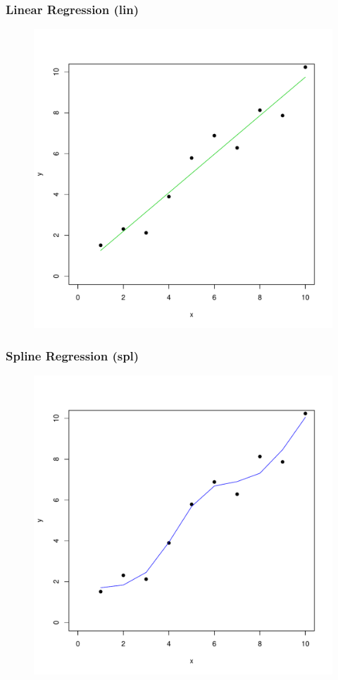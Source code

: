 \documentclass[xcolor=x11names,compress]{beamer}\usepackage[]{graphicx}\usepackage[]{color}
\newenvironment{knitrout}{}{} %
\begin{document}
\begin{frame}[plain]
  \frametitle{Linear Regression (lin)}
\begin{figure}
\centering
\begin{knitrout}\tiny
{}\color{fgcolor}

{\centering \includegraphics[width=.6\linewidth]{figure/beamer-unnamed-chunk-46-1} 

}



\end{knitrout}
\end{figure}
\end{frame}

\begin{frame}[plain]
  \frametitle{Spline Regression (spl)}
\begin{figure}
\centering
\begin{knitrout}\tiny
{}\color{fgcolor}

{\centering \includegraphics[width=.6\linewidth]{figure/beamer-unnamed-chunk-47-1} 

}



\end{knitrout}
\end{figure}
\end{frame}
\end{document}
